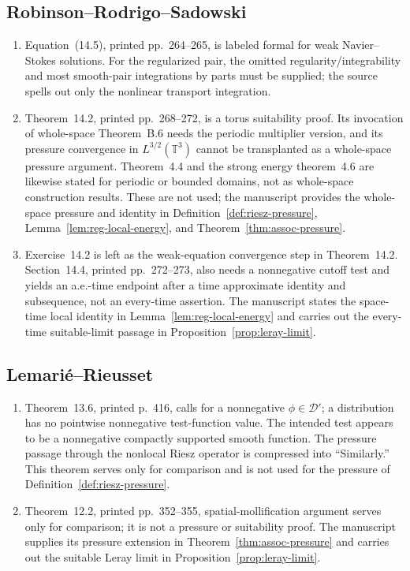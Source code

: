 \documentclass[11pt,reqno]{amsart}
\begin{document}
\subsection*{Robinson--Rodrigo--Sadowski}

\begin{enumerate}
\item Equation~(14.5), printed pp.~264--265, is labeled formal for weak Navier--Stokes solutions. For the regularized pair, the omitted regularity/integrability and most smooth-pair integrations by parts must be supplied; the source spells out only the nonlinear transport integration.

\item Theorem~14.2, printed pp.~268--272, is a torus suitability proof. Its invocation of whole-space Theorem~B.6 needs the periodic multiplier version, and its pressure convergence in \(L^{3/2}(\mathbb T^3)\) cannot be transplanted as a whole-space pressure argument. Theorem~4.4 and the strong energy theorem~4.6 are likewise stated for periodic or bounded domains, not as whole-space construction results. These are not used; the manuscript provides the whole-space pressure and identity in Definition~\ref{def:riesz-pressure}, Lemma~\ref{lem:reg-local-energy}, and Theorem~\ref{thm:assoc-pressure}.

\item Exercise~14.2 is left as the weak-equation convergence step in Theorem~14.2. Section~14.4, printed pp.~272--273, also needs a nonnegative cutoff test and yields an a.e.-time endpoint after a time approximate identity and subsequence, not an every-time assertion. The manuscript states the space-time local identity in Lemma~\ref{lem:reg-local-energy} and carries out the every-time suitable-limit passage in Proposition~\ref{prop:leray-limit}.
\end{enumerate}

\subsection*{Lemarié--Rieusset}

\begin{enumerate}
\item Theorem~13.6, printed p.~416, calls for a nonnegative \(\phi\in\mathcal D'\); a distribution has no pointwise nonnegative test-function value. The intended test appears to be a nonnegative compactly supported smooth function. The pressure passage through the nonlocal Riesz operator is compressed into “Similarly.” This theorem serves only for comparison and is not used for the pressure of Definition~\ref{def:riesz-pressure}.

\item Theorem~12.2, printed pp.~352--355, spatial-mollification argument serves only for comparison; it is not a pressure or suitability proof. The manuscript supplies its pressure extension in Theorem~\ref{thm:assoc-pressure} and carries out the suitable Leray limit in Proposition~\ref{prop:leray-limit}.
\end{enumerate}



\end{document}
